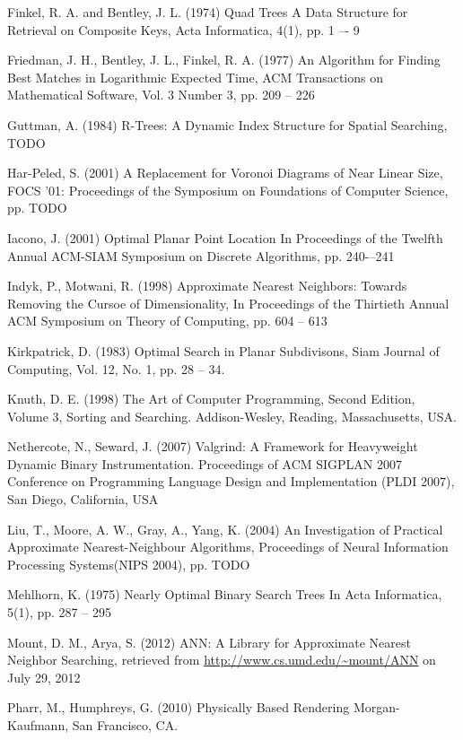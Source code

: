 \documentclass[mcs]{scsthesis}
\begin{document}
\begin{thebibliography}{5}
Finkel, R. A. and Bentley, J. L. (1974) Quad Trees A Data Structure for
Retrieval on Composite Keys, Acta Informatica, 4(1), pp. 1 –- 9 

Friedman, J. H., Bentley, J. L., Finkel, R. A. (1977) An Algorithm for Finding
Best Matches in Logarithmic Expected Time, ACM Transactions on Mathematical
Software, Vol. 3 Number 3, pp. 209 -- 226

Guttman, A. (1984) R-Trees: A Dynamic Index Structure for Spatial Searching,
TODO 

Har-Peled, S. (2001) A Replacement for Voronoi Diagrams of Near Linear Size, 
FOCS '01: Proceedings of the Symposium on Foundations of Computer Science, 
pp. TODO

Iacono, J. (2001) Optimal Planar Point Location
In Proceedings of the Twelfth Annual ACM-SIAM Symposium on Discrete Algorithms,
pp. 240-–241

Indyk, P., Motwani, R. (1998) Approximate Nearest Neighbors: Towards Removing
the Cursoe of Dimensionality, In Proceedings of the Thirtieth Annual ACM
Symposium on Theory of Computing, pp. 604 -- 613 

Kirkpatrick, D. (1983) Optimal Search in Planar Subdivisons,
Siam Journal of Computing, Vol. 12, No. 1, pp. 28 -- 34.

Knuth, D. E. (1998) The Art of Computer Programming, Second Edition,
Volume 3, Sorting and Searching.  Addison-Wesley, Reading, Massachusetts, USA.

Nethercote, N., Seward, J. (2007) Valgrind: A Framework for Heavyweight Dynamic
Binary Instrumentation.  Proceedings of ACM SIGPLAN 2007 Conference on
Programming Language Design and Implementation (PLDI 2007),
San Diego, California, USA 

Liu, T., Moore, A. W., Gray, A., Yang, K. (2004) An Investigation of Practical
Approximate Nearest-Neighbour Algorithms, Proceedings of Neural Information
Processing Systems(NIPS 2004), pp. TODO  

Mehlhorn, K. (1975) Nearly Optimal Binary Search Trees 
In Acta Informatica, 5(1), pp. 287 – 295

Mount, D. M., Arya, S. (2012) ANN: A Library for Approximate Nearest Neighbor
Searching, retrieved from \url{http://www.cs.umd.edu/~mount/ANN} on July 29, 2012 

Pharr, M., Humphreys, G. (2010) Physically Based Rendering
Morgan-Kaufmann, San Francisco, CA.  


\end{thebibliography}
\end{document}

